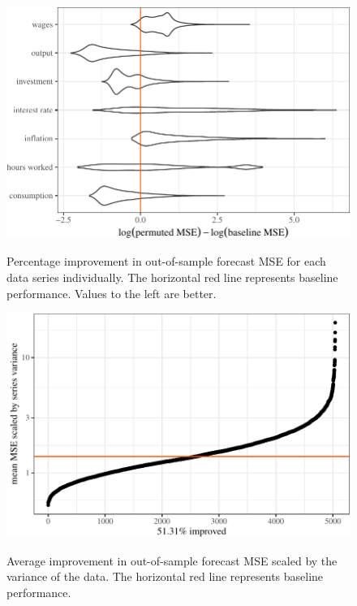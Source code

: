 \documentclass[11pt]{article}
\begin{document}
\begin{figure}[t]
{\centering \includegraphics{gfx/series-percent-improvement-1}  }
\caption{Percentage improvement in out-of-sample forecast MSE for each data series individually. The horizontal red line represents baseline performance. Values to the left are better.}\label{fig:series-percent-improvement}
\end{figure}

\begin{figure}[t]
{\centering \includegraphics{gfx/mean-scaled-mse-1} }
\caption{Average improvement in out-of-sample forecast MSE scaled by the variance of the data. The horizontal red line represents baseline performance.}\label{fig:mean-scaled-mse}
\end{figure}
\end{document}
